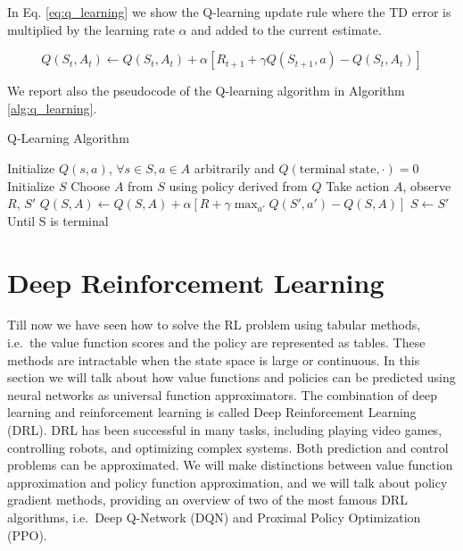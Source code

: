In Eq. \ref{eq:q_learning} we show the Q-learning update rule where the TD error is multiplied by the learning rate $\alpha$ and added to the current estimate.

\begin{equation} \label{eq:q_learning}
    Q(S_t, A_t) \leftarrow Q(S_t, A_t) + \alpha [R_{t+1} + \gamma Q(S_{t+1}, a) - Q(S_t, A_t)]
\end{equation}

We report also the pseudocode of the Q-learning algorithm in Algorithm \ref{alg:q_learning}.


\begin{algorithm}
\caption{Q-Learning Algorithm}\label{alg:q_learning}
\begin{algorithmic}
\State Initialize $Q(s, a)$,  $\forall s \in S, a \in A$ arbitrarily and $Q(\text{terminal state}, \cdot) = 0$
    \State Initialize $S$
        \State Choose $A$ from $S$ using policy derived from $Q$
        \State Take action $A$, observe $R$, $S'$
        \State $Q(S, A) \leftarrow Q(S, A) + \alpha [R + \gamma \max_{a'} Q(S', a') - Q(S, A)]$
        \State $S \leftarrow S'$
    \EndFor
\State Until S is terminal
\EndFor




\end{algorithmic}
\end{algorithm}



\section{Deep Reinforcement Learning}
\label{sec:drl}
Till now we have seen how to solve the RL problem using tabular methods, i.e.\ the value function scores and the policy are represented as tables.
These methods are intractable when the state space is large or continuous.
In this section we will talk about how value functions and policies can be predicted using neural networks as universal function approximators.
The combination of deep learning and reinforcement learning is called Deep Reinforcement Learning (DRL).
DRL has been successful in many tasks, including playing video games, controlling robots, and optimizing complex systems.
Both prediction and control problems can be approximated.
We will make distinctions between value function approximation and policy function approximation, and we will talk about policy gradient methods, providing an overview of two of the most famous DRL algorithms, i.e.\ Deep Q-Network (DQN) and Proximal Policy Optimization (PPO).


